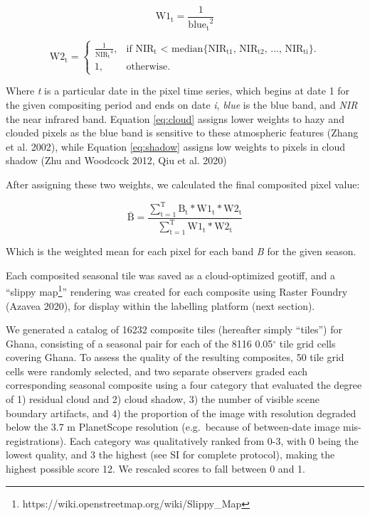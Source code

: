 \documentclass[11pt,a4paper]{article}
\begin{document}
\begin{equation} \label{eq:cloud}
\mathrm{W1_t} = \frac{1}{\mathrm{blue_t}^2}
\end{equation}

\begin{equation} \label{eq:shadow}  
\mathrm{W2_t} =\begin{cases}
    \frac{1}{\mathrm{NIR_t}^4}, & \text{if $\mathrm{NIR_t}$ < median\{$\mathrm{NIR_{t1}}$, $\mathrm{NIR_{t2}}$, ..., $\mathrm{NIR_{ti}}$\}}.\\
    1, & \text{otherwise}.
  \end{cases}
\end{equation}

Where \emph{t} is a particular date in the pixel time series, which
begins at date 1 for the given compositing period and ends on date
\emph{i}, \emph{blue} is the blue band, and \emph{NIR} the near infrared
band. Equation \ref{eq:cloud} assigns lower weights to hazy and clouded
pixels as the blue band is sensitive to these atmospheric features
(Zhang et al. 2002), while Equation \ref{eq:shadow} assigns low weights
to pixels in cloud shadow (Zhu and Woodcock 2012, Qiu et al. 2020)

After assigning these two weights, we calculated the final composited
pixel value:

\begin{equation}
\mathrm{\bar{B} = \frac{\sum_{t=1}^{T}B_t * W1_t * W2_t}{\sum_{t=1}^{T}W1_t * W2_t}}
\end{equation}

Which is the weighted mean for each pixel for each band \emph{B} for the
given season.

Each composited seasonal tile was saved as a cloud-optimized geotiff,
and a ``slippy
map\footnote{https://wiki.openstreetmap.org/wiki/Slippy\_Map}''
rendering was created for each composite using Raster Foundry (Azavea
2020), for display within the labelling platform (next section).

We generated a catalog of 16232 composite tiles (hereafter simply
``tiles'') for Ghana, consisting of a seasonal pair for each of the 8116
0.05\(^\circ\) tile grid cells covering Ghana. To assess the quality of
the resulting composites, 50 tile grid cells were randomly selected, and
two separate observers graded each corresponding seasonal composite
using a four category that evaluated the degree of 1) residual cloud and
2) cloud shadow, 3) the number of visible scene boundary artifacts, and
4) the proportion of the image with resolution degraded below the 3.7 m
PlanetScope resolution (e.g.~because of between-date image
mis-registrations). Each category was qualitatively ranked from 0-3,
with 0 being the lowest quality, and 3 the highest (see SI for complete
protocol), making the highest possible score 12. We rescaled scores to
fall between 0 and 1.
\end{document}
